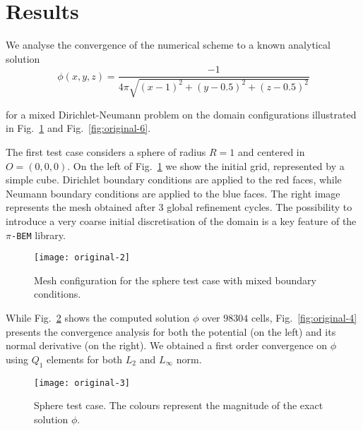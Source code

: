
\section{Results}
\label{sec:Results}

We analyse the convergence of the numerical scheme to a known analytical solution 
\begin{equation}
\label{eq:analytical-sol-known}
\phi(x,y,z)=\frac{-1}{4\pi\sqrt{(x-1)^2+(y-0.5)^2+(z-0.5)^2}} 
\end{equation}

for a mixed Dirichlet-Neumann problem on the domain configurations illustrated in Fig.~\ref{fig:original-2} and Fig.~\ref{fig:original-6}.

The first test case considers a sphere of radius $R=1$ and centered in $O=(0,0,0)$. On the left of Fig.~\ref{fig:original-2} we show the initial grid, represented by a simple cube. Dirichlet boundary conditions are applied to the red faces, while Neumann boundary conditions are applied to the blue faces. The right image represents the mesh obtained after 3 global refinement cycles. The possibility to introduce a very coarse initial discretisation of the domain is a key feature of the $\pi$\texttt{-BEM} library.

\begin{figure}[htp]
\begin{center}
    \texttt{[image: original-2]}    %
    \caption{Mesh configuration for the sphere test case with mixed boundary conditions.} 
    \label{fig:original-2}
\end{center}
\end{figure}

While Fig.~\ref{fig:original-3} shows the computed solution $\phi$ over $98304$ cells, Fig.~\ref{fig:original-4} presents the convergence analysis for both the potential (on the left) and its normal derivative (on the right). We obtained a first order convergence on $\phi$ using $Q_1$ elements for both $L_2$ and $L_\infty$ norm. 

\begin{figure}[htp]
\begin{center}
    \texttt{[image: original-3]}    %
    \caption{Sphere test case. The colours represent the magnitude of the exact solution $\phi$.} 
    \label{fig:original-3}
\end{center}
\end{figure}

